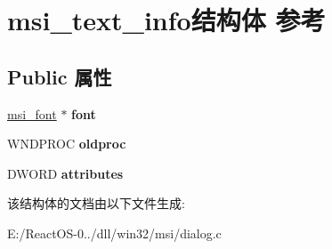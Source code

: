 \hypertarget{structmsi__text__info}{}\section{msi\+\_\+text\+\_\+info结构体 参考}
\label{structmsi__text__info}
\subsection*{Public 属性}
\begin{DoxyCompactItemize}
\item 
\mbox{\label{structmsi__text__info_a72f767e46c6c085ddc3e5048ee1d8b81}} 
\hyperlink{structmsi__font__tag}{msi\+\_\+font} $\ast$ {\bfseries font}
\item 
\mbox{\label{structmsi__text__info_a7f100d8f3f724fcc3408cfef31534d23}} 
W\+N\+D\+P\+R\+OC {\bfseries oldproc}
\item 
\mbox{\label{structmsi__text__info_a69f22e43a32e090560b30a23bc2103d1}} 
D\+W\+O\+RD {\bfseries attributes}
\end{DoxyCompactItemize}


该结构体的文档由以下文件生成\+:\begin{DoxyCompactItemize}
\item 
E\+:/\+React\+O\+S-\/0../dll/win32/msi/dialog.\+c\end{DoxyCompactItemize}
